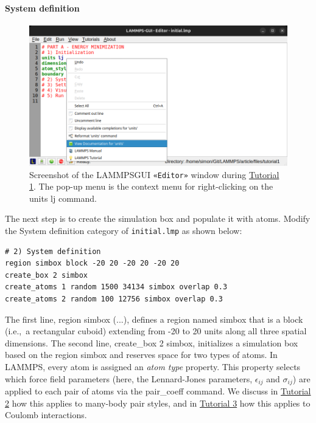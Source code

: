 \documentclass[9pt,tutorial]{livecoms}
\newcommand{\lmpcmd}[1]{\colorbox{listing}{\textcolor{command}{\small{#1}}}} %
\newcommand{\flecmd}[1]{\textcolor{command}{\texttt{#1}}} %
\newcommand{\guicmd}[1]{\textcolor{command}{\texttt{«#1»}}} %
\newcommand{\lammpsgui}{\textsf{LAMMPS\textendash GUI}}
\begin{document}
\paragraph{System definition}

\begin{figure}
\centering
\includegraphics[width=\linewidth]{GUI-1.png}
\caption{Screenshot of the \lammpsgui{} \guicmd{Editor} window during
  \hyperref[lennard-jones-label]{Tutorial 1}.  The pop-up menu is the
  context menu for right-clicking on the \lmpcmd{units lj} command.}
\label{fig:GUI-1}
\end{figure}

The next step is to create the simulation box and populate it with
atoms.  Modify the \lmpcmd{System definition} category of
\flecmd{initial.lmp} as shown below:
\begin{lstlisting}
# 2) System definition
region simbox block -20 20 -20 20 -20 20
create_box 2 simbox
create_atoms 1 random 1500 34134 simbox overlap 0.3
create_atoms 2 random 100 12756 simbox overlap 0.3
\end{lstlisting}
The first line, \lmpcmd{region simbox (...)}, defines a region named
\lmpcmd{simbox} that is a block (i.e.,~a rectangular cuboid) extending
from -20 to 20 units along all three spatial dimensions.  The second
line, \lmpcmd{create\_box 2 simbox}, initializes a simulation box based
on the region \lmpcmd{simbox} and reserves space for two types of atoms.
{\color{blue}In LAMMPS, every atom is assigned an \emph{atom type}
  property.  This property selects which force field parameters (here,
  the Lennard-Jones parameters, $\epsilon_{ij}$ and $\sigma_{ij}$) are
  applied to each pair of atoms via the \lmpcmd{pair\_coeff} command.
  We discuss in \hyperref[carbon-nanotube-label]{Tutorial 2} how this
  applies to many-body pair styles, and in
  \hyperref[all-atom-label]{Tutorial 3} how this applies to Coulomb
  interactions.}
\end{document}
